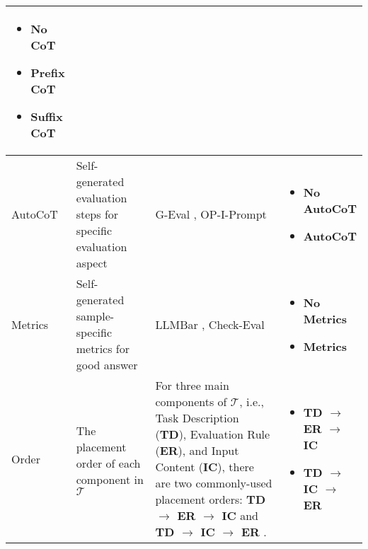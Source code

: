 \begin{table*} [t]
{\begin{tabular}{p{0.09\linewidth}p{0.24\linewidth}p{0.44\linewidth}p{0.23\linewidth}}
\begin{minipage}[t]{\linewidth}
\begin{itemize}[itemsep=0.5pt, topsep=0pt, left=0pt]
     \item \textbf{No CoT}
     \item \textbf{Prefix CoT}
     \item \textbf{Suffix CoT}
 \end{itemize}\vspace{-7pt}\end{minipage} \\
 \midrule
 AutoCoT & Self-generated evaluation steps for specific evaluation aspect & G-Eval \cite{liu-etal-2023-g}, OP-I-Prompt \cite{siledar-etal-2024-one} & \begin{minipage}[t]{\linewidth}\vspace{-7pt}\begin{itemize}[noitemsep, topsep=0pt, left=0pt]
     \item \textbf{No AutoCoT}
     \item \textbf{AutoCoT}
 \end{itemize}\vspace{-7pt}\end{minipage} \\
 \midrule
 Metrics & Self-generated sample-specific metrics for good answer & LLMBar \cite{zeng2024llmbar}, Check-Eval \cite{pereira2024check}  & \begin{minipage}[t]{\linewidth}\vspace{-7pt}\begin{itemize}[noitemsep, topsep=0pt, left=0pt]
     \item \textbf{No Metrics}
     \item \textbf{Metrics}
 \end{itemize}\vspace{-7pt}\end{minipage} \\
 \midrule
 Order & The placement order of each component in $ \mathcal{T} $ & For three main components of $ \mathcal{T} $, i.e., Task Description (\textbf{TD}), Evaluation Rule (\textbf{ER}), and Input Content (\textbf{IC}), there are two commonly-used placement orders: \textbf{TD $\rightarrow$ ER $\rightarrow$ IC} \cite{zheng2023judging, liu-etal-2023-g} and \textbf{TD $\rightarrow$ IC $\rightarrow$ ER} \cite{liu-etal-2024-calibrating}.
 & \begin{minipage}[t]{\linewidth}\vspace{-7pt}\begin{itemize}[noitemsep, topsep=0pt, left=0pt]
     \item \textbf{TD $\rightarrow$ ER $\rightarrow$ IC}
     \item \textbf{TD $\rightarrow$ IC $\rightarrow$ ER}

\end{itemize}
\end{minipage}
\end{tabular}}
\end{table*}
